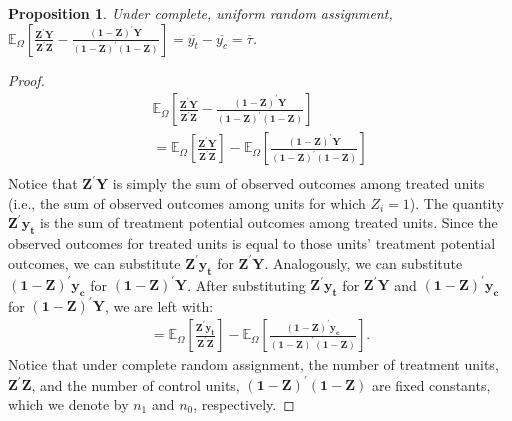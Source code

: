 \documentclass[12pt,leqno]{article}
\theoremstyle{newstyle}
\newtheorem{prop}[thm]{Proposition}
\begin{document}
\begin{prop} \label{prop: complete ran assign}
Under complete, uniform random assignment, $\mathbb{E}_{\Omega} \left[\frac{\mathbf{Z}^{\prime}\mathbf{Y}}{\mathbf{Z}^{\prime}\mathbf{Z}} - \frac{(\mathbf{1} - \mathbf{Z})^{\prime} \mathbf{Y}}{(\mathbf{1} - \mathbf{Z})^{\prime}(\mathbf{1} - \mathbf{Z})}\right] = \overline{y_{t}} - \overline{y_{c}} = \overline{\tau}$.
\end{prop}
\begin{proof}
\begin{align*}
\mathbb{E}_{\Omega} \left[\frac{\mathbf{Z}^{\prime}\mathbf{Y}}{\mathbf{Z}^{\prime}\mathbf{Z}} - \frac{(\mathbf{1} - \mathbf{Z})^{\prime} \mathbf{Y}}{(\mathbf{1} - \mathbf{Z})^{\prime}(\mathbf{1} - \mathbf{Z})}\right] \\
= \mathbb{E}_{\Omega} \left[\frac{\mathbf{Z}^{\prime}\mathbf{Y}}{\mathbf{Z}^{\prime}\mathbf{Z}}\right] - \mathbb{E}_{\Omega}\left[\frac{(\mathbf{1} - \mathbf{Z})^{\prime} \mathbf{Y}}{(\mathbf{1} - \mathbf{Z})^{\prime}(\mathbf{1} - \mathbf{Z})}\right] \\
\end{align*}
Notice that $\mathbf{Z}^{\prime}\mathbf{Y}$ is simply the sum of observed outcomes among treated units (i.e., the sum of observed outcomes among units for which $Z_i = 1$). The quantity $\mathbf{Z}^{\prime}\mathbf{y_t}$ is the sum of treatment potential outcomes among treated units. Since the observed outcomes for treated units is equal to those units' treatment potential outcomes, we can substitute $\mathbf{Z}^{\prime}\mathbf{y_t}$ for $\mathbf{Z}^{\prime}\mathbf{Y}$. Analogously, we can substitute $\left(\mathbf{1} - \mathbf{Z}\right)^{\prime}\mathbf{y_c}$ for $\left(\mathbf{1} - \mathbf{Z}\right)^{\prime}\mathbf{Y}$. After substituting $\mathbf{Z}^{\prime}\mathbf{y_t}$ for $\mathbf{Z}^{\prime}\mathbf{Y}$ and $\left(\mathbf{1} - \mathbf{Z}\right)^{\prime}\mathbf{y_c}$ for $\left(\mathbf{1} - \mathbf{Z}\right)^{\prime}\mathbf{Y}$, we are left with:
\begin{align*}
= \mathbb{E}_{\Omega} \left[\frac{\mathbf{Z}^{\prime} \mathbf{y_t}}{\mathbf{Z}^{\prime}\mathbf{Z}}\right] - \mathbb{E}_{\Omega}\left[\frac{(\mathbf{1} - \mathbf{Z})^{\prime} \mathbf{y_c}}{(\mathbf{1} - \mathbf{Z})^{\prime}(\mathbf{1} - \mathbf{Z})}\right].
\end{align*}
Notice that under complete random assignment, the number of treatment units, $\mathbf{Z}^{\prime}\mathbf{Z}$, and the number of control units, $\left(\mathbf{1} - \mathbf{Z}\right)^{\prime}\left(\mathbf{1} - \mathbf{Z}\right)$ are fixed constants, which we denote by $n_1$ and $n_0$, respectively.


\end{proof}
\end{document}
